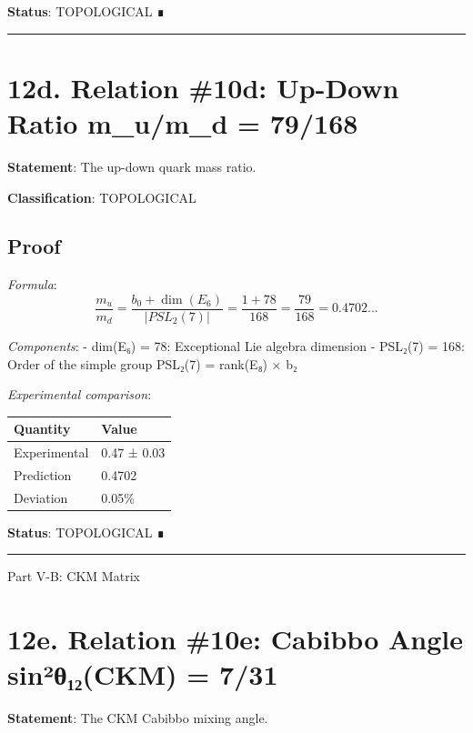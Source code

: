 \documentclass[11pt,a4paper]{article}
\begin{document}
\textbf{Status}: TOPOLOGICAL ∎

\begin{center}\rule{\linewidth}{0.5pt}\end{center}

\section{12d. Relation \#10d: Up-Down Ratio m\_\allowbreak{}u/m\_\allowbreak{}d = 79/168}\label{d.-relation-10d-up-down-ratio-m_um_d-79168}

\textbf{Statement}: The up-down quark mass ratio.

\textbf{Classification}: TOPOLOGICAL

\subsection{Proof}\label{proof-11}

\emph{Formula}: \[\frac{m_u}{m_d} = \frac{b_0 + \dim(E_6)}{|PSL_2(7)|} = \frac{1 + 78}{168} = \frac{79}{168} = 0.4702...\]

\emph{Components}: - dim(E₆) = 78: Exceptional Lie algebra dimension - \textbar PSL₂(7)\textbar{} = 168: Order of the simple group PSL₂(7) = rank(E₈) × b₂

\emph{Experimental comparison}:

\begin{longtable}[]{@{}ll@{}}
\toprule\noalign{}
Quantity & Value \\
\midrule\noalign{}
\endhead
\bottomrule\noalign{}
\endlastfoot
Experimental & 0.47 ± 0.03 \\
Prediction & 0.4702 \\
Deviation & 0.05\% \\
\end{longtable}

\textbf{Status}: TOPOLOGICAL ∎

\begin{center}\rule{\linewidth}{0.5pt}\end{center}

Part V-B: CKM Matrix

\section{12e. Relation \#10e: Cabibbo Angle sin²θ₁₂(CKM) = 7/31}\label{e.-relation-10e-cabibbo-angle-sinuxb2ux3b8ux2081ux2082ckm-731}

\textbf{Statement}: The CKM Cabibbo mixing angle.
\end{document}
